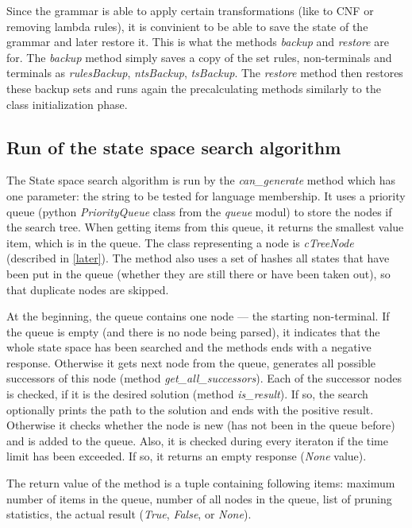 Since the grammar is able to apply certain transformations (like to CNF or removing lambda rules), it is convinient to be able to save the state of the grammar and later restore it. This is what the methods \textit{backup} and \textit{restore} are for. The \textit{backup} method simply saves a copy of the set rules, non-terminals and terminals as \textit{rulesBackup}, \textit{ntsBackup}, \textit{tsBackup}. The \textit{restore} method then restores these backup sets and runs again the precalculating methods similarly to the class initialization phase.

\subsection{Run of the state space search algorithm}
The State space search algorithm is run by the \textit{can\_generate} method which has one parameter: the string to be tested for language membership. It uses a priority queue (python \textit{PriorityQueue} class from the \textit{queue} modul) to store the nodes if the search tree. When getting items from this queue, it returns the smallest value item, which is in the queue. The class representing a node is \textit{cTreeNode} (described in \ref{later}). The method also uses a set of hashes all states that have been put in the queue (whether they are still there or have been taken out), so that duplicate nodes are skipped.

At the beginning, the queue contains one node --- the starting non-terminal. If the queue is empty (and there is no node being parsed), it indicates that the whole state space has been searched and the methods ends with a negative response. Otherwise it gets next node from the queue, generates all possible successors of this node (method \textit{get\_all\_successors}). Each of the successor nodes is checked, if it is the desired solution (method \textit{is\_result}). If so, the search optionally prints the path to the solution and ends with the positive result. Otherwise it checks whether the node is new (has not been in the queue before) and is added to the queue. Also, it is checked during every iteraton if the time limit has been exceeded. If so, it returns an empty response (\textit{None} value).

The return value of the method is a tuple containing following items: maximum number of items in the queue, number of all nodes in the queue, list of pruning statistics, the actual result (\textit{True}, \textit{False}, or \textit{None}).

